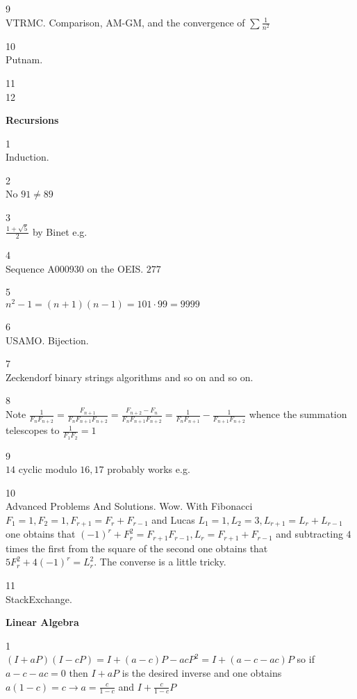 9 \\
VTRMC. Comparison, AM-GM, and the convergence of $\sum \frac{1}{n^2}$

10 \\
Putnam.

11 \\


12 \\


\newpage

\textbf{Recursions}

1 \\
Induction.

2 \\
No $91 \neq 89$

3 \\
$\boxed{\frac{1+\sqrt{5}}{2}}$ by Binet e.g.

4 \\
Sequence A000930 on the OEIS. $\boxed{277}$

5 \\
$n^2-1=(n+1)(n-1)=101 \cdot 99=\boxed{9999}$

6 \\
USAMO. Bijection.

7 \\
Zeckendorf binary strings algorithms and so on and so on.

8 \\
Note $\frac{1}{F_n F_{n+2}}=\frac{F_{n+1}}{F_n F_{n+1} F_{n+2}}=\frac{F_{n+2}-F_n}{F_n F_{n+1} F_{n+2}}=\frac{1}{F_n F_{n+1}}-\frac{1}{F_{n+1} F_{n+2}}$ whence the summation telescopes to $\frac{1}{F_1 F_2}=\boxed{1}$

9 \\
$\boxed{14}$ cyclic modulo $16,17$ probably works e.g.

10 \\
Advanced Problems And Solutions. Wow. With Fibonacci $F_1=1, F_2=1, F_{r+1}=F_r+F_{r-1}$ and Lucas $L_1=1, L_2=3, L_{r+1}=L_r+L_{r-1}$ one obtains that $(-1)^r+F_r^2=F_{r+1}F_{r-1}, L_r=F_{r+1}+F_{r-1}$ and subtracting $4$ times the first from the square of the second one obtains that $5F_r^2+4(-1)^r=L_r^2$. The converse is a little tricky.

11 \\
StackExchange.

\newpage

\textbf{Linear Algebra}

1 \\
$(I+aP)(I-cP)=I+(a-c)P-acP^2=I+(a-c-ac)P$ so if $a-c-ac=0$ then $I+aP$ is the desired inverse and one obtains $a(1-c)=c \to a=\frac{c}{1-c}$ and $\boxed{I+\frac{c}{1-c} P}$


